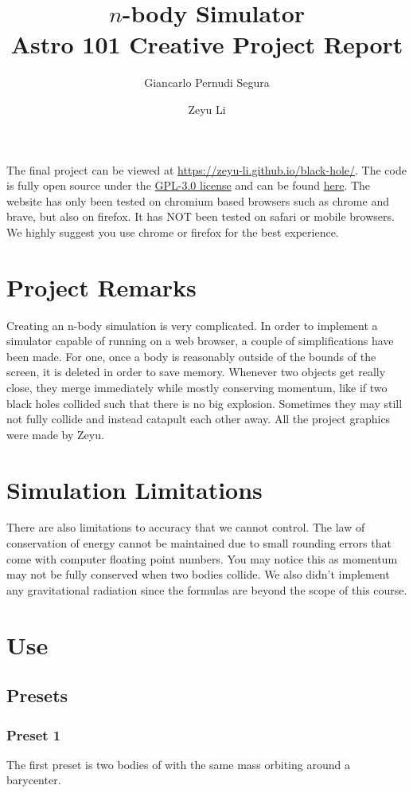 \documentclass{article}
\title{%
	$n$-body Simulator \\
	\large{Astro 101 Creative Project Report}
}
\author[1]{Giancarlo Pernudi Segura}
\affil{pernudi@ualberta.ca}
\author[2]{Zeyu Li}
\affil{zeyu7@ualberta.ca}
\begin{document}
\maketitle

The final project can be viewed at \url{https://zeyu-li.github.io/black-hole/}. The code is fully open source under the \href{https://raw.githubusercontent.com/Zeyu-Li/black-hole/main/LICENSE}{GPL-3.0 license} and can be found \href{https://github.com/Zeyu-Li/black-hole}{here}. The website has only been tested on chromium based browsers such as chrome and brave, but also on firefox. It has NOT been tested on safari or mobile browsers. We highly suggest you use chrome or firefox for the best experience.

\section{Project Remarks}
Creating an n-body simulation is very complicated. In order to implement a simulator capable of running on a web browser, a couple of simplifications have been made. For one, once a body is reasonably outside of the bounds of the screen, it is deleted in order to save memory. Whenever two objects get really close, they merge immediately while mostly conserving momentum, like if two black holes collided such that there is no big explosion. Sometimes they may still not fully collide and instead catapult each other away. All the project graphics were made by Zeyu.

\section{Simulation Limitations}
There are also limitations to accuracy that we cannot control. The law of conservation of energy cannot be maintained due to small rounding errors that come with computer floating point numbers. You may notice this as momentum may not be fully conserved when two bodies collide. We also didn't implement any gravitational radiation since the formulas are beyond the scope of this course.

\section{Use}
\subsection{Presets}
\subsubsection{Preset 1}
The first preset is two bodies of with the same mass orbiting around a barycenter.
\end{document}
